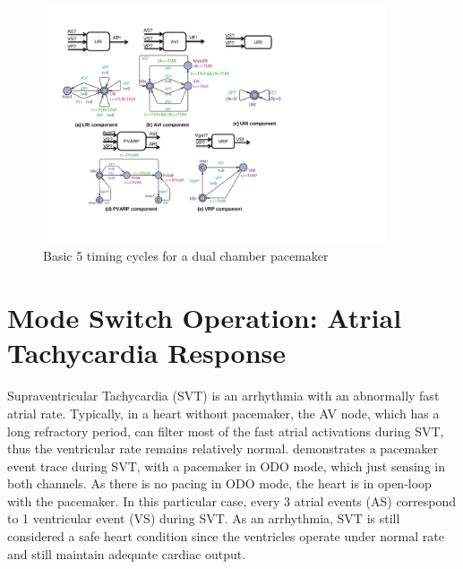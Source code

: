 \begin{figure}[!t]
\center
\includegraphics[width=0.9\textwidth]{figs/pacemaker.pdf}
\caption{Basic 5 timing cycles for a dual chamber pacemaker}
\label{fig:PMdesign}
\end{figure} 

\section{Mode Switch Operation: Atrial Tachycardia Response}
Supraventricular Tachycardia (SVT) is an arrhythmia with an abnormally fast atrial rate. %
Typically, in a heart without pacemaker, the AV node, which has a long refractory period, can filter most of the fast atrial activations during SVT, thus the ventricular rate remains relatively normal.  demonstrates a pacemaker event trace during SVT, with a pacemaker in ODO mode, which just sensing in both channels. 
As there is no pacing in ODO mode, the heart is in open-loop with the pacemaker. In this particular case, every 3 atrial events (AS) correspond to 1 ventricular event (VS) during SVT. 
As an arrhythmia, SVT is still considered a safe heart condition since the ventricles operate under normal rate and still maintain adequate cardiac output. 

